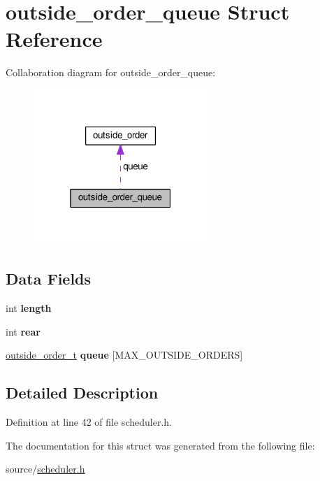 \hypertarget{structoutside__order__queue}{}\section{outside\+\_\+order\+\_\+queue Struct Reference}
\label{structoutside__order__queue}


Collaboration diagram for outside\+\_\+order\+\_\+queue\+:\nopagebreak
\begin{figure}[H]
\begin{center}
\leavevmode
\includegraphics[width=187pt]{structoutside__order__queue__coll__graph}
\end{center}
\end{figure}
\subsection*{Data Fields}
\begin{DoxyCompactItemize}
\item 
int {\bfseries length}\hypertarget{structoutside__order__queue_a8259fe8daf9f79a1acb9523b5750bd77}{}\label{structoutside__order__queue_a8259fe8daf9f79a1acb9523b5750bd77}

\item 
int {\bfseries rear}\hypertarget{structoutside__order__queue_af5116728b6d122a7b020ed4bd1a32f1b}{}\label{structoutside__order__queue_af5116728b6d122a7b020ed4bd1a32f1b}

\item 
\hyperlink{structoutside__order}{outside\+\_\+order\+\_\+t} {\bfseries queue} \mbox{[}M\+A\+X\+\_\+\+O\+U\+T\+S\+I\+D\+E\+\_\+\+O\+R\+D\+E\+RS\mbox{]}\hypertarget{structoutside__order__queue_a42fc224e7f768fb3b882628d8c052ca4}{}\label{structoutside__order__queue_a42fc224e7f768fb3b882628d8c052ca4}

\end{DoxyCompactItemize}


\subsection{Detailed Description}


Definition at line 42 of file scheduler.\+h.



The documentation for this struct was generated from the following file\+:\begin{DoxyCompactItemize}
\item 
source/\hyperlink{scheduler_8h}{scheduler.\+h}\end{DoxyCompactItemize}
